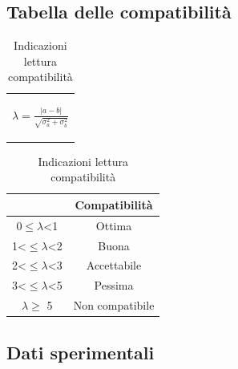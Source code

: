 \documentclass{article}
\begin{document}
\subsection{Tabella delle compatibilità}
\medskip
\begin{table}[H]
    \centering
    \begin{tabular}{c}
        \begin{Large}
        $\lambda=\frac{|a-b|}{\sqrt{\sigma_a^2+\sigma_b^2}}$
        \end{Large}\\
    \end{tabular}
    \hspace{0.5cm}
    \begin{tabular}{cc}
        \toprule
        &       \textbf{Compatibilità   }       \\
        \midrule
        0$\leq \lambda$<1   &Ottima                 \\
        1<$\leq \lambda$<2   &Buona                  \\
        2<$\leq \lambda$<3   &Accettabile            \\
        3<$\leq\lambda$<5   &Pessima                \\
        $ \lambda \geq $  5     &Non compatibile        \\
        \bottomrule
    \end{tabular}
    \caption{Indicazioni lettura compatibilità}
\end{table}

\subsection{Dati sperimentali}
\end{document}

